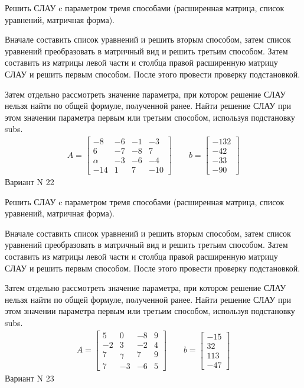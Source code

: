 \documentclass[11pt]{report}
\begin{document}
Решить СЛАУ c параметром тремя способами (расширенная матрица, список уравнений, матричная форма).

Вначале составить список уравнений и решить вторым способом,
затем список уравнений преобразовать в матричный вид и решить третьим способом.
Затем составить из матрицы левой части и столбца правой расширенную матрицу СЛАУ и решить первым способом.
После этого провести проверку подстановкой.

Затем отдельно рассмотреть значение параметра, при котором решение СЛАУ нельзя найти по общей формуле,
полученной ранее.
Найти решение СЛАУ при этом значении параметра первым или третьим способом, используя подстановку subs.
\begin{align*}
    A = \left[\begin{matrix}-8 & -6 & -1 & -3\\6 & -7 & -8 & 7\\\alpha & -3 & -6 & -4\\-14 & 1 & 7 & -10\end{matrix}\right]
\qquad b = \left[\begin{matrix}-132\\-42\\-33\\-90\end{matrix}\right]
\end{align*}
\newpage
Вариант N 22


Решить СЛАУ c параметром тремя способами (расширенная матрица, список уравнений, матричная форма).

Вначале составить список уравнений и решить вторым способом,
затем список уравнений преобразовать в матричный вид и решить третьим способом.
Затем составить из матрицы левой части и столбца правой расширенную матрицу СЛАУ и решить первым способом.
После этого провести проверку подстановкой.

Затем отдельно рассмотреть значение параметра, при котором решение СЛАУ нельзя найти по общей формуле,
полученной ранее.
Найти решение СЛАУ при этом значении параметра первым или третьим способом, используя подстановку subs.
\begin{align*}
    A = \left[\begin{matrix}5 & 0 & -8 & 9\\-2 & 3 & -2 & 4\\7 & \gamma & 7 & 9\\7 & -3 & -6 & 5\end{matrix}\right]
\qquad b = \left[\begin{matrix}-15\\32\\113\\-47\end{matrix}\right]
\end{align*}
\newpage
Вариант N 23
\end{document}
